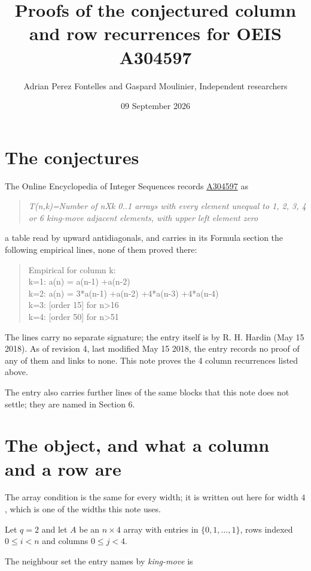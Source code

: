 \documentclass[11pt]{article}
\title{Proofs of the conjectured column and row recurrences for OEIS A304597}
\author{Adrian Perez Fontelles and Gaspard Moulinier, Independent researchers}
\date{09 September 2026}
\theoremstyle{definition}
\begin{document}
\maketitle
\section{The conjectures}

The Online Encyclopedia of Integer Sequences records \href{https://oeis.org/A304597}{A304597} as

\begin{quote}\itshape T(n,k)=Number of nXk 0..1 arrays with every element unequal to 1, 2, 3, 4 or 6 king-move adjacent elements, with upper left element zero\end{quote}

a table read by upward antidiagonals, and carries in its Formula section the following empirical lines, none of them proved there:

\begin{quote}\ttfamily Empirical for column k:\\
k=1: a(n) = a(n-1) +a(n-2)\\k=2: a(n) = 3*a(n-1) +a(n-2) +4*a(n-3) +4*a(n-4)\\k=3: [order 15] for n>16\\k=4: [order 50] for n>51\end{quote}

The lines carry no separate signature; the entry itself is by R. H. Hardin (May 15 2018). As of revision 4, last modified May 15 2018, the entry records no proof of any of them and links to none. This note proves the 4 column recurrences listed above.

The entry also carries further lines of the same blocks that this note does not settle; they are named in Section 6.

\section{The object, and what a column and a row are}

The array condition is the same for every width; it is written out here for width $4$, which is one of the widths this note uses.

Let $q = 2$ and let $A$ be an $n \times 4$ array with entries in $\{0,1,\dots,1\}$, rows indexed $0 \le i < n$ and columns $0 \le j < 4$.

The neighbour set the entry names by {\itshape king-move} is
\end{document}
